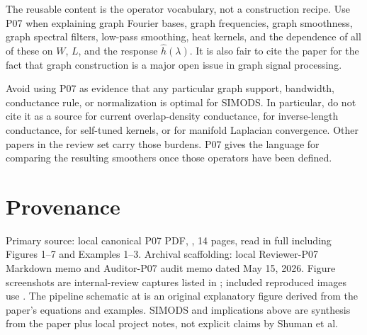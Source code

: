 \documentclass[11pt]{article}
\begin{document}
The reusable content is the operator vocabulary, not a construction recipe.
Use P07 when explaining graph Fourier bases, graph frequencies, graph
smoothness, graph spectral filters, low-pass smoothing, heat kernels, and the
dependence of all of these on $W$, $L$, and the response $\hat h(\lambda)$.
It is also fair to cite the paper for the fact that graph construction is a
major open issue in graph signal processing.

Avoid using P07 as evidence that any particular graph support, bandwidth,
conductance rule, or normalization is optimal for SIMODS.  In particular, do
not cite it as a source for current  overlap-density conductance,
for inverse-length conductance, for self-tuned kernels, or for manifold
Laplacian convergence.  Other papers in the review set carry those burdens.
P07 gives the language for comparing the resulting smoothers once those
operators have been defined.

\section*{Provenance}

Primary source: local canonical P07 PDF,
, 14 pages, read in
full including Figures 1--7 and Examples 1--3.  Archival scaffolding: local
Reviewer-P07 Markdown memo and Auditor-P07 audit memo dated May 15, 2026.
Figure screenshots are internal-review captures listed in
; included reproduced images use
.  The pipeline schematic at
 is an original explanatory
figure derived from the paper's equations and examples.  SIMODS and
 implications above are synthesis from the paper plus local
project notes, not explicit claims by Shuman et al.



\end{document}
